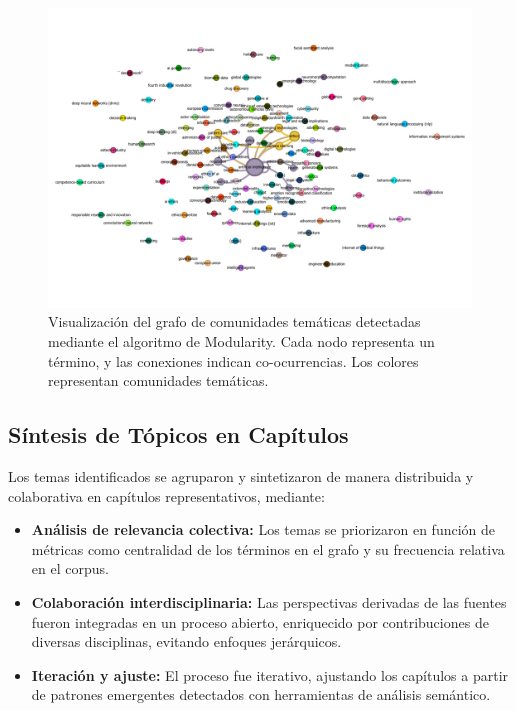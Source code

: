 \begin{refsection}
\begin{landscape}
\begin{figure}[ht]
    \centering
    \includegraphics[width=1.5\textwidth, height=1\textheight, keepaspectratio=false]{figures/ethics_ai_emergent_tecnologies.pdf}
    \caption{Visualización del grafo de comunidades temáticas detectadas mediante el algoritmo de Modularity. Cada nodo representa un término, y las conexiones indican co-ocurrencias. Los colores representan comunidades temáticas.}
    \label{fig:grafo_modularity}
\end{figure}
\end{landscape}



\subsection{Síntesis de Tópicos en Capítulos}

Los temas identificados se agruparon y sintetizaron de manera distribuida y colaborativa en capítulos representativos, mediante:
\begin{itemize}
    \item \textbf{Análisis de relevancia colectiva:} Los temas se priorizaron en función de métricas como centralidad de los términos en el grafo y su frecuencia relativa en el corpus.
    \item \textbf{Colaboración interdisciplinaria:} Las perspectivas derivadas de las fuentes fueron integradas en un proceso abierto, enriquecido por contribuciones de diversas disciplinas, evitando enfoques jerárquicos.
    \item \textbf{Iteración y ajuste:} El proceso fue iterativo, ajustando los capítulos a partir de patrones emergentes detectados con herramientas de análisis semántico.
\end{itemize}


\end{refsection}
